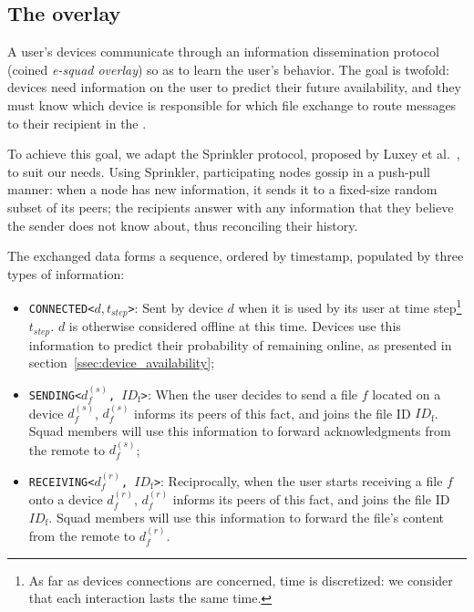 
\newcommand\fileid{\ensuremath{ID_{\text{f}}}\xspace}
\newcommand\sendingdevice{\ensuremath{d^{(s)}_f}\xspace}
\newcommand\recdevice{\ensuremath{d^{(r)}_f}\xspace}

\subsection{The \squad overlay}
\label{sec:squad_overlay}

A user's devices communicate through an information dissemination protocol (coined \emph{e-squad overlay}) so as to learn the user's behavior.
The goal is twofold: 
devices need information on the user to predict their future availability, 
and they must know which device is responsible for which file exchange to route messages to their recipient in the \squad.

To achieve this goal, we adapt the Sprinkler protocol, proposed by Luxey et al.~\cite{luxey:hal-01704172}, to suit our needs. 
Using Sprinkler, participating nodes gossip in a push-pull manner: 
when a node has new information, it sends it to a fixed-size random subset of its peers; 
the recipients answer with any information that they believe the sender does not know about, thus reconciling their history.

The exchanged data forms a sequence, ordered by timestamp, populated by three types of information:
\begin{itemize}
	\item \texttt{CONNECTED<$d, t_{step}$>}: Sent by device $d$ when it is used by its user at time step\footnote{As far as devices connections are concerned, time is discretized: we consider that each interaction lasts the same time.} $t_{step}$. $d$ is otherwise considered offline at this time. Devices use this information to predict their probability of remaining online, as presented in section~\ref{ssec:device_availability};
	\item \texttt{SENDING<\sendingdevice, \fileid>}: When the user decides to send a file $f$ located on a device \sendingdevice, \sendingdevice informs its peers of this fact, and joins the file ID \fileid. Squad members will use this information to forward acknowledgments from the remote to \sendingdevice;
	\item \texttt{RECEIVING<\recdevice, \fileid>}: Reciprocally, when the user starts receiving a file $f$ onto a device \recdevice, \recdevice informs its peers of this fact, and joins the file ID \fileid. Squad members will use this information to forward the file's content from the remote to \recdevice.
\end{itemize}

